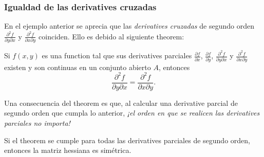 \begin{frame}
\frametitle{Igualdad de las derivatives cruzadas}
En el ejemplo anterior se aprecia que las \emph{derivatives cruzadas} de segundo orden $\frac{\partial^2 f}{\partial y\partial x}$ y $\frac{\partial^2 f}{\partial x\partial y}$ coinciden. Ello es debido al siguiente theorem:

\begin{theorem}
Si $f(x,y)$ es una function tal que sus derivatives parciales $\frac{\partial f}{\partial x}$, $\frac{\partial f}{\partial y}$, $\frac{\partial^2 f}{\partial y\partial x}$ y $\frac{\partial^2 f}{\partial x\partial y}$ existen y son continuas en un conjunto abierto $A$, entonces
\[
\frac{\partial^2 f}{\partial y\partial x}=\frac{\partial^2 f}{\partial x\partial y}.
\]
\end{theorem}

Una consecuencia del theorem es que, al calcular una derivative parcial de segundo orden que cumpla lo anterior, \alert{\emph{¡el orden en que se realicen las derivatives parciales no importa!}}

Si el theorem se cumple para todas las derivatives parciales de segundo orden, entonces la matriz hessiana es simétrica.
\end{frame}
% 
% 
% 
% 

